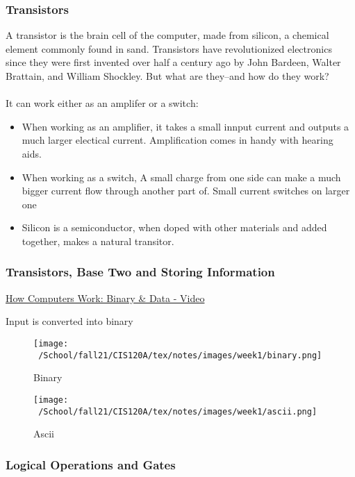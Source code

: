 \documentclass{article}
\begin{document}
\subsubsection{Transistors}
A transistor is the brain cell of the computer, made from silicon, a chemical element commonly found in sand. Transistors have revolutionized electronics since they were first invented over half a century ago by John Bardeen, Walter Brattain, and William Shockley. But what are they--and how do they work?
\\
\\
It can work either as an amplifer or a switch:
\begin{itemize}
\item When working as an amplifier, it takes a small innput current and outputs a much larger electical current. Amplification comes in handy with hearing aids.
\item When working as a switch, A small charge from one side can make a much bigger current flow through another part of. Small current switches on larger one
\item Silicon is a semiconductor, when doped with other materials and added together, makes a natural transitor.

\end{itemize}

\subsubsection{Transistors, Base Two and Storing Information}
\href{https://www.youtube.com/watch?v=USCBCmwMCDA&list=PLzdnOPI1iJNcsRwJhvksEo1tJqjIqWbN-&index=3}{How Computers Work: Binary \& Data - Video}

Input is converted into binary

\begin{figure}[h]
\centering
\texttt{[image: ~/School/fall21/CIS120A/tex/notes/images/week1/binary.png]}
\caption{Binary\label{binary.png}}
\end{figure}

\begin{figure}[h]
\centering
\texttt{[image: ~/School/fall21/CIS120A/tex/notes/images/week1/ascii.png]}
\caption{Ascii\label{ascii.png}}
\end{figure}


\subsubsection{Logical Operations and Gates}
\end{document}

